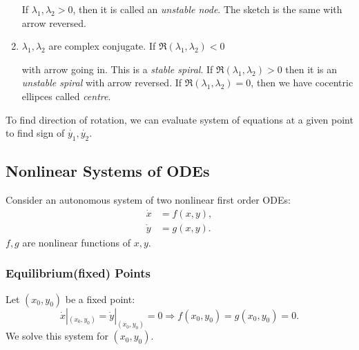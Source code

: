 \documentclass[10pt]{article}
\begin{document}
\begin{enumerate}
\begin{center}
          \end{center}
          If $ \lambda_1,\lambda_2>0 $, then it is called an \textit{unstable node}. The sketch is the same with arrow reversed.
          \item $ \lambda_1,\lambda_2 $ are complex conjugate. If $ \Re(\lambda_1,\lambda_2)<0 $
          \begin{center}
          \end{center}
          with arrow going in. This is a \textit{stable spiral}. If $ \Re(\lambda_1,\lambda_2)>0 $ then it is an \textit{unstable spiral} with arrow reversed. If $ \Re(\lambda_1,\lambda_2)=0 $, then we have cocentric ellipces called \textit{centre}. 
    \end{enumerate}
    \begin{remark}
        To find direction of rotation, we can evaluate system of equations at a given point to find sign of $ \dot{y_1},\dot{y_2} $.
    \end{remark}
    \subsection{Nonlinear Systems of ODEs}
    Consider an autonomous system of two nonlinear first order ODEs:
    \begin{align*}
        \dot{x}&= f(x,y),\\
        \dot{y}&= g(x,y).
    \end{align*}
    $f,g$ are nonlinear functions of $x,y$.
    \subsubsection*{Equilibrium(fixed) Points}
    Let $ (x_0,y_0) $ be a fixed point:
    \[
        \dot{x}|_{(x_0,y_0)} = \dot{y}|_{(x_0,y_0)}=0 \Rightarrow f(x_0,y_0)=g(x_0,y_0)=0.
    \]
    We solve this system for $(x_0,y_0)$.
\end{document}
